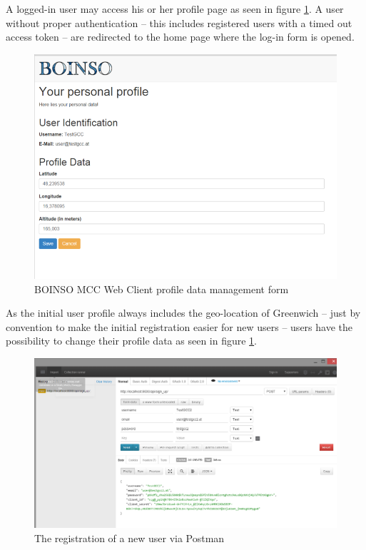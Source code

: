 \documentclass[BachelorPaper]{subfiles}
\begin{document}
A logged-in user may access his or her profile page as seen in figure \ref{fig:mcc_web_4}. A user without proper authentication -- this includes registered users with a timed out access token -- are redirected to the home page where the log-in form is opened. \\

\begin{figure}[!htbp]
\centering
\includegraphics[width=0.96\linewidth]{PICs/BacPics/results/mcc_webapp_4.png}
\caption{BOINSO MCC Web Client profile data management form}\label{fig:mcc_web_4}
\end{figure}

As the initial user profile always includes the geo-location of Greenwich -- just by convention to make the initial registration easier for new users -- users have the possibility to change their profile data as seen in figure \ref{fig:mcc_web_4}. \\

\begin{figure}[!htbp]
\centering
\includegraphics[width=0.96\linewidth]{PICs/BacPics/results/postman_1.png}
\caption{The registration of a new user via Postman}\label{fig:postman_1}
\end{figure}
\end{document}
